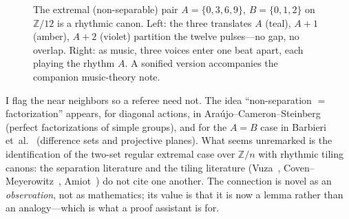 \documentclass[11pt]{article}
\newcommand{\Z}{\mathbb{Z}}
\begin{document}
\begin{figure}[t]
  \centering
  \caption{The extremal (non-separable) pair $A=\{0,3,6,9\}$, $B=\{0,1,2\}$ on
  $\Z/12$ is a rhythmic canon. Left: the three translates $A$ (teal), $A{+}1$
  (amber), $A{+}2$ (violet) partition the twelve pulses---no gap, no overlap.
  Right: as music, three voices enter one beat apart, each playing the rhythm
  $A$. A sonified version accompanies the companion music-theory note.}
  \label{fig:canon}
\end{figure}

I flag the near neighbors so a referee need not. The idea ``non-separation $=$
factorization'' appears, for diagonal actions, in
Araújo--Cameron--Steinberg~\cite{ACS2017} (perfect factorizations of simple
groups), and for the $A=B$ case in Barbieri et~al.~\cite{Barbieri2025}
(difference sets and projective planes). What seems unremarked is the
identification of the two-set regular extremal case over $\Z/n$ with rhythmic
tiling canons: the separation literature and the tiling literature
(Vuza~\cite{Vuza1991}, Coven--Meyerowitz~\cite{CovenMeyerowitz1999},
Amiot~\cite{Amiot2016}) do not cite one another. The connection is novel as an
\emph{observation}, not as mathematics; its value is that it is now a lemma rather
than an analogy---which is what a proof assistant is for.
\end{document}
